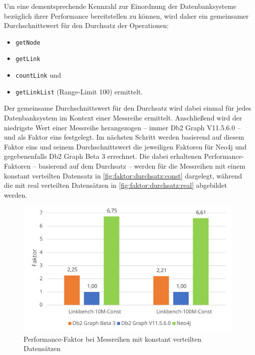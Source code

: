Um eine dementsprechende Kennzahl zur Einordnung der Datenbanksysteme bezüglich ihrer Performance bereitstellen zu können, wird daher ein gemeinsamer Durchschnittswert für den Durchsatz der Operationen:
\begin{itemize}
    \item \texttt{getNode}
    \item \texttt{getLink}
    \item \texttt{countLink} und 
    \item \texttt{getLinkList} (Range-Limit 100) ermittelt.
\end{itemize}
Der gemeinsame Durchschnittswert für den Durchsatz wird dabei einmal für jedes Datenbanksystem im Kontext einer Messreihe ermittelt. Anschließend wird der niedrigste Wert einer Messreihe herangezogen -- immer Db2 Graph V11.5.6.0 -- und als Faktor eins festgelegt. Im nächsten Schritt werden basierend auf diesem Faktor eins und seinem Durchschnittswert die jeweiligen Faktoren für Neo4j und gegebenenfalls Db2 Graph Beta 3 errechnet. Die dabei erhaltenen Performance-Faktoren -- basierend auf dem Durchsatz -- werden für die Messreihen mit einem konstant verteilten Datensatz in \autoref{fig:faktor:durchsatz:const} dargelegt, während die mit real verteilten Datensätzen in \autoref{fig:faktor:durchsatz:real} abgebildet werden.

\begin{figure}[!ht]
    \centering
    \includegraphics[width=\textwidth]{images/diagramme/faktor_durchschittlicher_durchsatz_const.pdf}
    \caption{Performance-Faktor bei Messreihen mit konstant verteilten Datensätzen}
    \label{fig:faktor:durchsatz:const}
\end{figure}

